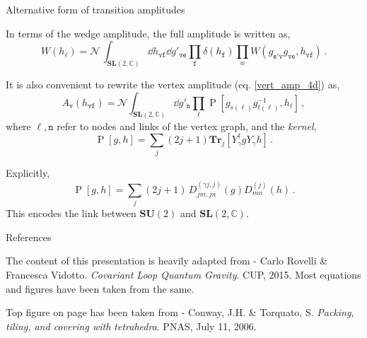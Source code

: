 \documentclass[12pt,titlepage]{article}
\begin{document}
\begin{frame}{Alternative form of transition amplitudes}
    \begin{list}{\,}{\leftmargin=1em \itemindent=0em}
        \item<1-> In terms of the wedge amplitude, the full amplitude is written as,
        \begin{equation}
            W(h_\ell)=\mathcal{N}\,\int_{{\mathbf{SL}(2,\mathbb{C})}}\dd{h_\mathtt{vf}}\dd{g'_\mathtt{ve}}\prod_{\mathtt{f}}\delta(h_\mathtt{f})\prod_w W(g_\mathtt{e'v}g_\mathtt{ve},h_\mathtt{vf})\,.
        \end{equation}
        \item<2-> It is also convenient to rewrite the vertex amplitude (eq. \ref{vert_amp_4d}) as,
        \begin{equation}
            A_\mathtt{v}(h_\mathtt{vf})=\mathcal{N}\int_{{\mathbf{SL}(2,\mathbb{C})}}\dd{g'_\mathtt{n}}\prod_\ell\operatorname{P}[g_{s(\ell)}g^{-1}_{t(\ell)},h_\ell]\,,
        \end{equation}
        where $\ell,\mathtt{n}$ refer to nodes and links of the vertex graph, and the \textit{kernel},
        \begin{equation}
            \operatorname{P}[g,h]=\sum_j(2j+1)\mathbf{Tr}_{j}[Y_\gamma^\dagger g Y_\gamma h]\,.
        \end{equation}
        \item<3-> Explicitly,
        \begin{equation}
            \operatorname{P}[g,h]=\sum_j(2j+1)\,D^{(\gamma j,j)}_{jm,jn}(g) D^{(j)}_{mn}(h)\,.
        \end{equation}
        This encodes the link between $\mathbf{SU}(2)$ and $\mathbf{SL}(2,\mathbb{C})$.
    \end{list}
\end{frame}


\begin{frame}{References}
    \begin{list}{\,}{\leftmargin=1em \itemindent=0em}
        \item<1-> The content of this presentation is heavily adapted from - Carlo Rovelli \& Francesca Vidotto. \emph{Covariant Loop Quantum Gravity}. CUP, 2015. Most equations and figures have been taken from the same.
        \item<2-> Top figure on page \pageref{fig:4.4} has been taken from - Conway, J.H. \& Torquato, S. \emph{Packing, tiling, and covering with tetrahedra}. PNAS, July 11, 2006.
    \end{list}
\end{frame}
\end{document}
